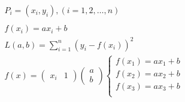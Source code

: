 \documentclass{article}
\begin{document}
\begin{equation}
    \begin{aligned}
        P_i=(x_i,y_i),(i=1,2,\dots,n)\\
        \\
        f(x_i)=ax_i + b\\     
        L(a,b)=\sum_{i=1}^n(y_i-f(x_i))^2  \\ 
        f(x)=\begin{pmatrix}
            x_i&1
        \end{pmatrix}\begin{pmatrix}
            a\\b
        \end{pmatrix}
        \begin{cases}
            f(x_1)=a x_1 +b   \\
            f(x_2)=a x_2 +b   \\
            f(x_3)=a x_3 +b   \\
            

\end{cases}
\end{aligned}
\end{equation}
\end{document}
